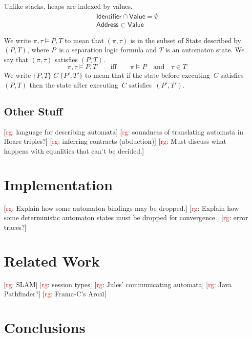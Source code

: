 \documentclass[a4paper]{article}
\newcommand{\todo}[2]{{\small [\textcolor{red}{#1}: #2]}}
\newcommand{\rg}[1]{\todo{rg}{#1}}
\theoremstyle{remark}
\begin{document}
Unlike stacks, heaps are indexed by values.
\begin{gather}
\mathsf{Identifier}\cap\mathsf{Value}=\emptyset \\
\mathsf{Address}\subset\mathsf{Value}
\end{gather}

We write $\pi,\tau\vDash P,T$ to mean that $(\pi,\tau)$ is in the subset of \textsf{State} described by~$(P,T)$, where $P$~is a separation logic formula and $T$ is an automaton state.
We say that $(\pi,\tau)$ satisfies $(P,T)$.
\begin{equation}
\pi, \tau \vDash P, T 
  \qquad\text{iff}\qquad
\pi \vDash P
  \quad\text{and}\quad
\tau\in T
\end{equation}
We write $\{P,T\}\;C\;\{P',T'\}$ to mean that if the state before executing~$C$ satisfies $(P,T)$ then the state after executing~$C$ satisfies~$(P',T')$.

\subsection{Other Stuff} %

\rg{language for describing automata}
\rg{soundness of translating automata in Hoare triples?}
\rg{inferring contracts (abduction)}
\rg{Must discuss what happens with equalities that can't be decided.}

\section{Implementation} %

\rg{Explain how some automaton bindings may be dropped.}
\rg{Explain how some deterministic automaton states must be dropped for convergence.}
\rg{error traces?}

\section{Related Work} %

\rg{SLAM}
\rg{session types}
\rg{Jules' communicating automata}
\rg{Java Pathfinder?}
\rg{Frama-C's Aroa\"\i}

\section{Conclusions} %



\end{document}
